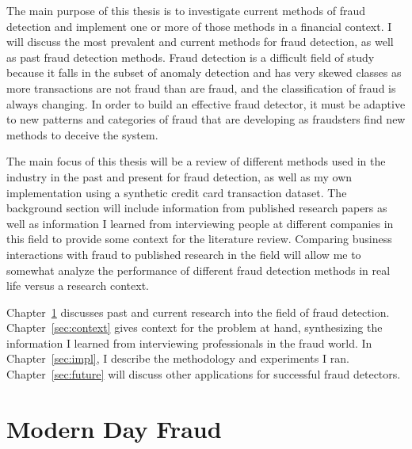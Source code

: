 \documentclass[midd]{thesis}
\begin{document}
The main purpose of this thesis is to investigate current methods of fraud detection and implement one or more of those methods in a financial context. I will discuss the most prevalent and current methods for fraud detection, as well as past fraud detection methods. Fraud detection is a difficult field of study because it falls in the subset of anomaly detection and has very skewed classes as more transactions are not fraud than are fraud, and the classification of fraud is always changing. In order to build an effective fraud detector, it must be adaptive to new patterns and categories of fraud that are developing as fraudsters find new methods to deceive the system.

The main focus of this thesis will be a review of different methods used in the industry in the past and present for fraud detection, as well as my own implementation using a synthetic credit card transaction dataset. The background section will include information from published research papers as well as information I learned from interviewing people at different companies in this field to provide some context for the literature review. Comparing business interactions with fraud to published research in the field will allow me to somewhat analyze the performance of different fraud detection methods in real life versus a research context.  

Chapter~\ref{sec:background} discusses past and current research into the field of fraud detection. Chapter~\ref{sec:context} gives context for the problem at hand, synthesizing the information I learned from interviewing professionals in the fraud world. In Chapter~\ref{sec:impl}, I describe the methodology and experiments I ran. Chapter~\ref{sec:future} will discuss other applications for successful fraud detectors.



\pagebreak

\chapter{Modern Day Fraud}
\label{sec:background}
\end{document}
